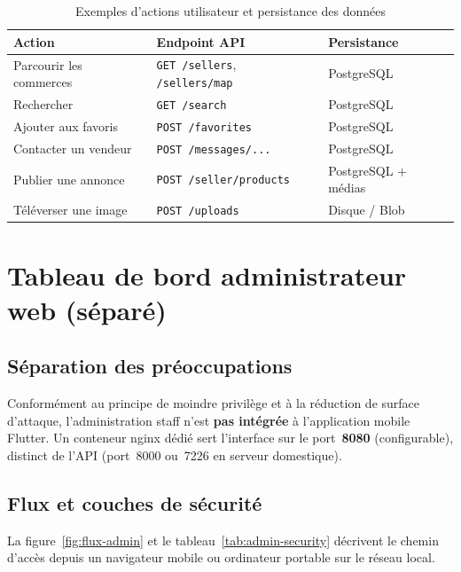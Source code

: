 \begin{table}[H]
  \centering
  \caption{Exemples d'actions utilisateur et persistance des données}
  \label{tab:flux-actions}
  \begin{tabularx}{\textwidth}{@{}lXX@{}}
    \toprule
    \textbf{Action} & \textbf{Endpoint API} & \textbf{Persistance} \\
    \midrule
    Parcourir les commerces & \texttt{GET /sellers}, \texttt{/sellers/map} & PostgreSQL \\
    Rechercher & \texttt{GET /search} & PostgreSQL \\
    Ajouter aux favoris & \texttt{POST /favorites} & PostgreSQL \\
    Contacter un vendeur & \texttt{POST /messages/...} & PostgreSQL \\
    Publier une annonce & \texttt{POST /seller/products} & PostgreSQL + médias \\
    Téléverser une image & \texttt{POST /uploads} & Disque / Blob \\
    \bottomrule
  \end{tabularx}
\end{table}

\section{Tableau de bord administrateur web (séparé)}

\subsection{Séparation des préoccupations}

Conformément au principe de moindre privilège et à la réduction de surface d'attaque, l'administration staff n'est \textbf{pas intégrée} à l'application mobile Flutter. Un conteneur nginx dédié sert l'interface sur le port~\textbf{8080} (configurable), distinct de l'API (port~8000 ou~7226 en serveur domestique).

\subsection{Flux et couches de sécurité}

La figure~\ref{fig:flux-admin} et le tableau~\ref{tab:admin-security} décrivent le chemin d'accès depuis un navigateur mobile ou ordinateur portable sur le réseau local.

